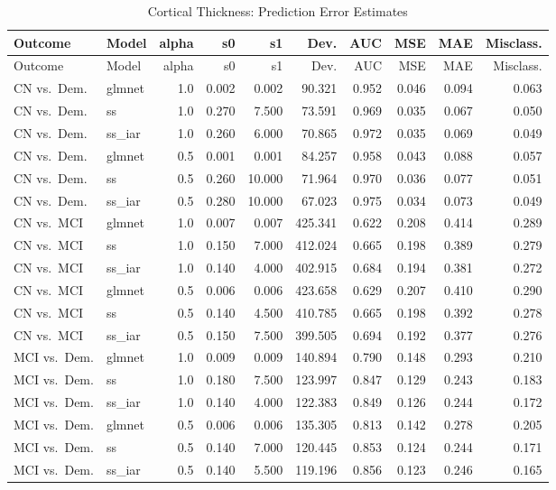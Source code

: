 \documentclass[
]{article}
\begin{document}
\begin{longtable}[]{@{}llrrrrrrrr@{}}
\caption{Cortical Thickness: Prediction Error Estimates}\tabularnewline
\toprule
Outcome & Model & alpha & s0 & s1 & Dev. & AUC & MSE & MAE &
Misclass.\tabularnewline
\midrule
\endfirsthead
\toprule
Outcome & Model & alpha & s0 & s1 & Dev. & AUC & MSE & MAE &
Misclass.\tabularnewline
\midrule
\endhead
CN vs.~Dem. & glmnet & 1.0 & 0.002 & 0.002 & 90.321 & 0.952 & 0.046 &
0.094 & 0.063\tabularnewline
CN vs.~Dem. & ss & 1.0 & 0.270 & 7.500 & 73.591 & 0.969 & 0.035 & 0.067
& 0.050\tabularnewline
CN vs.~Dem. & ss\_iar & 1.0 & 0.260 & 6.000 & 70.865 & 0.972 & 0.035 &
0.069 & 0.049\tabularnewline
CN vs.~Dem. & glmnet & 0.5 & 0.001 & 0.001 & 84.257 & 0.958 & 0.043 &
0.088 & 0.057\tabularnewline
CN vs.~Dem. & ss & 0.5 & 0.260 & 10.000 & 71.964 & 0.970 & 0.036 & 0.077
& 0.051\tabularnewline
CN vs.~Dem. & ss\_iar & 0.5 & 0.280 & 10.000 & 67.023 & 0.975 & 0.034 &
0.073 & 0.049\tabularnewline
CN vs.~MCI & glmnet & 1.0 & 0.007 & 0.007 & 425.341 & 0.622 & 0.208 &
0.414 & 0.289\tabularnewline
CN vs.~MCI & ss & 1.0 & 0.150 & 7.000 & 412.024 & 0.665 & 0.198 & 0.389
& 0.279\tabularnewline
CN vs.~MCI & ss\_iar & 1.0 & 0.140 & 4.000 & 402.915 & 0.684 & 0.194 &
0.381 & 0.272\tabularnewline
CN vs.~MCI & glmnet & 0.5 & 0.006 & 0.006 & 423.658 & 0.629 & 0.207 &
0.410 & 0.290\tabularnewline
CN vs.~MCI & ss & 0.5 & 0.140 & 4.500 & 410.785 & 0.665 & 0.198 & 0.392
& 0.278\tabularnewline
CN vs.~MCI & ss\_iar & 0.5 & 0.150 & 7.500 & 399.505 & 0.694 & 0.192 &
0.377 & 0.276\tabularnewline
MCI vs.~Dem. & glmnet & 1.0 & 0.009 & 0.009 & 140.894 & 0.790 & 0.148 &
0.293 & 0.210\tabularnewline
MCI vs.~Dem. & ss & 1.0 & 0.180 & 7.500 & 123.997 & 0.847 & 0.129 &
0.243 & 0.183\tabularnewline
MCI vs.~Dem. & ss\_iar & 1.0 & 0.140 & 4.000 & 122.383 & 0.849 & 0.126 &
0.244 & 0.172\tabularnewline
MCI vs.~Dem. & glmnet & 0.5 & 0.006 & 0.006 & 135.305 & 0.813 & 0.142 &
0.278 & 0.205\tabularnewline
MCI vs.~Dem. & ss & 0.5 & 0.140 & 7.000 & 120.445 & 0.853 & 0.124 &
0.244 & 0.171\tabularnewline
MCI vs.~Dem. & ss\_iar & 0.5 & 0.140 & 5.500 & 119.196 & 0.856 & 0.123 &
0.246 & 0.165\tabularnewline
\bottomrule
\end{longtable}
\end{document}
